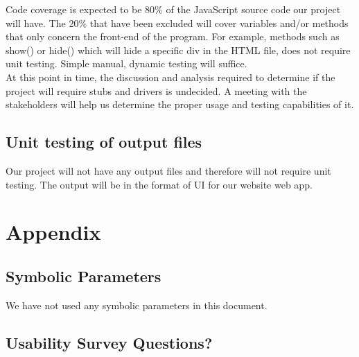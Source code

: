 \documentclass[12pt, titlepage]{article}
\begin{document}
Code coverage is expected to be 80\% of the JavaScript source code our project will have. The 20\% that have been excluded will cover variables and/or methods that only concern the front-end of the program. For example, methods such as show() or hide() which will hide a specific div in the HTML file, does not require unit testing. Simple manual, dynamic testing will suffice. \\

At this point in time, the discussion and analysis required to determine if the project will require stubs and drivers is undecided. A meeting with the stakeholders will help us determine the proper usage and testing capabilities of it. \\

\subsection{Unit testing of output files}		
Our project will not have any output files and therefore will not require unit testing. The output will be in the format of UI for our website web app.

%

%

\newpage

\section{Appendix}

\subsection{Symbolic Parameters}
We have not used any symbolic parameters in this document. 

\subsection{Usability Survey Questions?}
\end{document}
